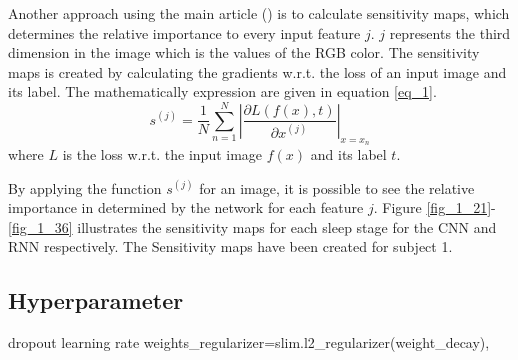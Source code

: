 Another approach using the main article (\cite{main_ar}) is to calculate sensitivity maps, which determines the relative importance to every input feature $j$. $j$ represents the third dimension in the image which is the values of the RGB color.
The sensitivity maps is created by calculating the gradients w.r.t. the loss of an input image and its label. The mathematically expression are given in equation \ref{eq_1}.
\begin{equation}
s^{\left(j\right)} = \frac { 1 }{ N  } \sum _{ n=1 }^{ N } \left| \frac { \partial L\left( f\left( x \right) ,t \right)  }{ \partial x^{ \left( j \right)  } }  \right| _{x=x_n}
\label{eq_1}
\end{equation}
where $L$ is the loss w.r.t. the input image $f\left(x\right)$ and its label $t$. 

By applying the function $s^{\left(j\right)}$ for an image, it is possible to see the relative importance in determined by the network for each feature $j$. 
Figure \ref{fig_1_21}-\ref{fig_1_36} illustrates the sensitivity maps for each sleep stage for the CNN and RNN respectively. The Sensitivity maps have been created for subject 1.



\subsection{Hyperparameter}




dropout 
learning rate
weights\_regularizer=slim.l2\_regularizer(weight\_decay),


